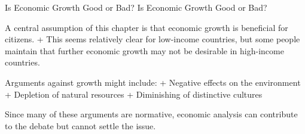 \documentclass[
  12pt,
  ignorenonframetext,
]{beamer}
\begin{document}
\begin{frame}{Is Economic Growth Good or Bad?}
\protect\hypertarget{is-economic-growth-good-or-bad}{}
Is Economic Growth Good or Bad?

A central assumption of this chapter is that economic growth is
beneficial for citizens. + This seems relatively clear for low-income
countries, but some people maintain that further economic growth may not
be desirable in high-income countries.

Arguments against growth might include: + Negative effects on the
environment + Depletion of natural resources + Diminishing of
distinctive cultures

Since many of these arguments are normative, economic analysis can
contribute to the debate but cannot settle the issue.
\end{frame}
\end{document}
